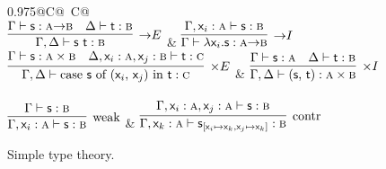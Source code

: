 \begin{figure}
	\centering
	\begin{tabularx}{0.975\textwidth}{@{}C@{~}C@{}}
		\\[2em]
		$\infer[\ii E]{\Gamma, \Delta \vdash \term{s~t} : \prop b}{\Gamma \vdash \term{s} : \prop{a} \ii \prop{b} & \Delta \vdash \term{t} : \prop{b}}$ 
		& 
		$\infer[\ii I]{\Gamma \vdash \term{\lam \vari .s} : \prop a \ii \prop{b}}{\Gamma, \term{\vari }: \prop{a} \vdash \term{s}:\prop{b}}$\\[2em]
		$\infer[\times E]
			{\Gamma,\Delta \vdash
			 \cterm{case \term{s} of (\term{\vari }, \term{\varj}) in \term{t}} 
			 : \prop{c}}
			{\Gamma \vdash \term{s}: \prop{a} \times \prop{b} & 
			\Delta, \term{\vari }: \prop{a} , \term{\varj}: \prop{b} \vdash \term{t}: \prop{c}}$ 
		&
		$\infer[\times I]
			{\Gamma, \Delta \vdash \cterm{(\term{s}, \term{t})}: \prop{a} \times \prop{b}}
			{\Gamma \vdash \term{s}: \prop{a} & \Delta \vdash \term{t}:\prop{b}}$\\[\smallsep]
		\\[2em]
		$\infer[\Weakening{}]
			{\Gamma, \term{\vari }: \prop{a} \vdash \term{s}: \prop{b}}
			{\Gamma \vdash \term{s}:\prop{b}} $ 
		&
		$\infer[\Contraction{}]
			{\Gamma, \term{\vark}: \prop{a} \vdash \term{s}_{[\term{\vari } \mapsto \term{\vark}, \term{\varj} \mapsto \term{\vark}]}:\prop{b}}
			{\Gamma,  \term{\vari }: \prop{a}, \term{\varj}: \prop{a} \vdash \term{s}: \prop{b}}$
		\end{tabularx}
	\caption{Simple type theory.}
	\label{figure:simple_type_theory}
\end{figure}

